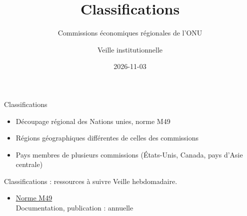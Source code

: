 \documentclass[aspectratio=169,11pt]{beamer}
\title{Classifications}
\subtitle{Commissions économiques régionales de l'ONU}
\author{Veille institutionnelle}
\date{2026-11-03}
\begin{document}
\begin{frame}\titlepage\end{frame}

\begin{frame}{Classifications}
\begin{itemize}
\item Découpage régional des Nations unies, norme M49
\item Régions géographiques différentes de celles des commissions
\item Pays membres de plusieurs commissions (États-Unis, Canada, pays d'Asie centrale)
\end{itemize}
\end{frame}

\begin{frame}{Classifications : ressources à suivre}
\small
Veille hebdomadaire.
\begin{itemize}
\item \href{https://unstats.un.org/unsd/methodology/m49/}{Norme M49}\\{\footnotesize Documentation, publication : annuelle}
\end{itemize}
\end{frame}
\end{document}
